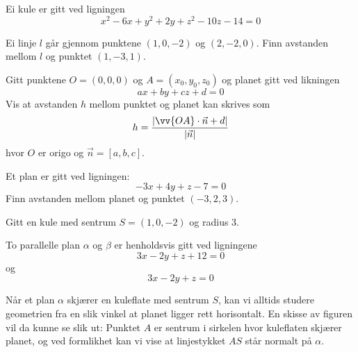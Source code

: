 Ei kule er gitt ved ligningen 
\[ x^2 - 6x + y^2 + 2y + z^2 - 10z-14=0 \]

\newpage
\nes
{} Ei linje $ l $ går gjennom punktene $ (1, 0, -2) $ og $ (2, -2,0) $. Finn avstanden mellom $ l $ og punktet $ (1, -3, 1) $. 


Gitt punktene $O=(0, 0, 0)$ og $A=(x_0, y_0, z_0)$ og planet gitt ved likningen
\[ ax+by+cz+d=0 \] 
Vis at avstanden $h$ mellom punktet og planet kan skrives som
\[ h=\frac{\left|\vv{OA}\cdot\vec{n}+d\right|}{|\vec{n}|} \]
hvor $O$ er origo og $\vec{n}=[a, b, c]$.

Et plan er gitt ved ligningen:
\[ -3x+4y+z-7 = 0 \]
Finn avstanden mellom planet og punktet $ (-3,2,3) $.

Gitt en kule med  sentrum $S=(1, 0, -2)$ og radius $3$.

To parallelle plan $ \alpha $ og $ \beta $ er henholdsvis gitt ved ligningene 
\[ 3x -2y +z +12 = 0 \]
og 
\[ 3x -2y +z = 0  \]


Når et plan $ \alpha $ skjærer en kuleflate med sentrum $ S $, kan vi alltids studere geometrien fra en slik vinkel at planet ligger rett horisontalt. En skisse av figuren vil da kunne se slik ut:
Punktet $ A $ er sentrum i sirkelen hvor kuleflaten skjærer planet, og ved formlikhet kan vi vise at linjestykket $ AS $ står normalt på $ \alpha $.\os


